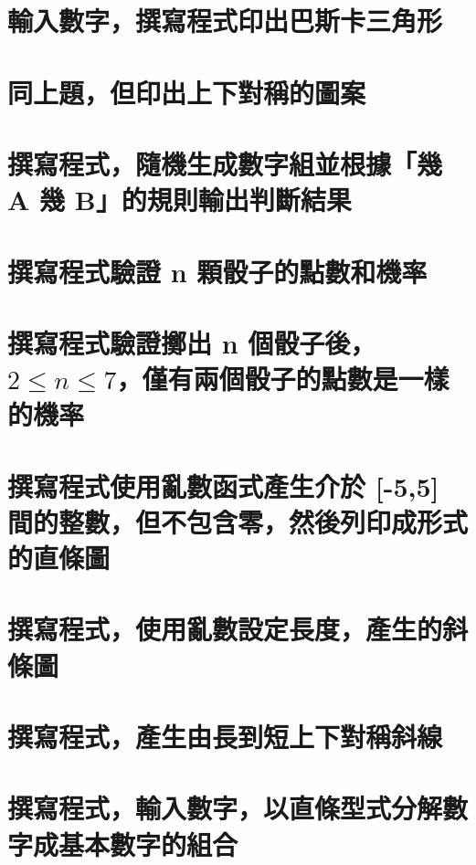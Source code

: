 \section{輸入數字，撰寫程式印出巴斯卡三角形}


\section{同上題，但印出上下對稱的圖案}


\section{撰寫程式，隨機生成數字組並根據「幾 A 幾 B」的規則輸出判斷結果}


\section{撰寫程式驗證 n 顆骰子的點數和機率}


\section{撰寫程式驗證擲出 n 個骰子後，$2 \leq n \leq 7$，僅有兩個骰子的點數是一樣的機率}


\section{撰寫程式使用亂數函式產生介於 [-5,5] 間的整數，但不包含零，然後列印成形式的直條圖}


\section{撰寫程式，使用亂數設定長度，產生的斜條圖}


\section{撰寫程式，產生由長到短上下對稱斜線}


\section{撰寫程式，輸入數字，以直條型式分解數字成基本數字的組合}


